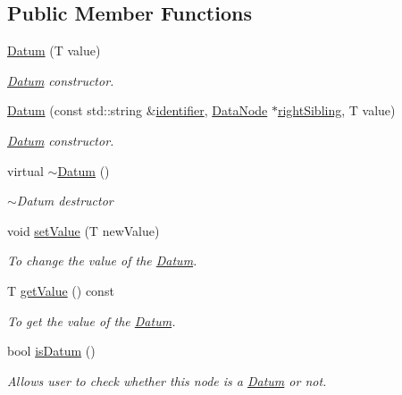 \subsection*{Public Member Functions}
\begin{DoxyCompactItemize}
\item 
\hyperlink{classDatabase_1_1Datum_a6c8c58a7e440ababc4f0a87f5da4d387}{Datum} (T value)
\begin{DoxyCompactList}\small\item\em \hyperlink{classDatabase_1_1Datum}{Datum} constructor. \end{DoxyCompactList}\item 
\hyperlink{classDatabase_1_1Datum_a7e35720d2b0b7baaff936163314940dd}{Datum} (const std\+::string \&\hyperlink{classDatabase_1_1DataNode_a2417b60924a11cf9157b996fbf7b2ca5}{identifier}, \hyperlink{classDatabase_1_1DataNode}{Data\+Node} $\ast$\hyperlink{classDatabase_1_1DataNode_ae335fc33c3813e8a6638d50faef44d5d}{right\+Sibling}, T value)
\begin{DoxyCompactList}\small\item\em \hyperlink{classDatabase_1_1Datum}{Datum} constructor. \end{DoxyCompactList}\item 
virtual \hyperlink{classDatabase_1_1Datum_a973e321d98f8be376fd8ec772446f480}{$\sim$\+Datum} ()\hypertarget{classDatabase_1_1Datum_a973e321d98f8be376fd8ec772446f480}{}\label{classDatabase_1_1Datum_a973e321d98f8be376fd8ec772446f480}

\begin{DoxyCompactList}\small\item\em $\sim$\+Datum destructor \end{DoxyCompactList}\item 
void \hyperlink{classDatabase_1_1Datum_a636a8ed59bfcb2947100f8181a9b5c73}{set\+Value} (T new\+Value)
\begin{DoxyCompactList}\small\item\em To change the value of the \hyperlink{classDatabase_1_1Datum}{Datum}. \end{DoxyCompactList}\item 
T \hyperlink{classDatabase_1_1Datum_ae33499d38a1e3ab4725fbf4f3ba9c284}{get\+Value} () const 
\begin{DoxyCompactList}\small\item\em To get the value of the \hyperlink{classDatabase_1_1Datum}{Datum}. \end{DoxyCompactList}\item 
bool \hyperlink{classDatabase_1_1Datum_a81a243020da7294ad331b50d45b86ad8}{is\+Datum} ()
\begin{DoxyCompactList}\small\item\em Allows user to check whether this node is a \hyperlink{classDatabase_1_1Datum}{Datum} or not. \end{DoxyCompactList}\end{DoxyCompactItemize}
